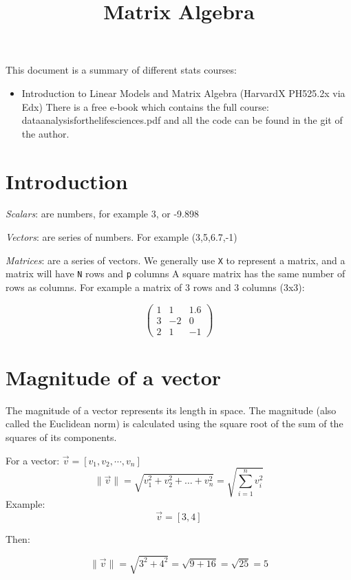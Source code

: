 \documentclass[
  letterpaper,
  DIV=11,
  numbers=noendperiod]{scrartcl}
\title{Matrix Algebra}
\author{}
\date{}
\providecommand{\tightlist}{%
  \setlength{\itemsep}{0pt}\setlength{\parskip}{0pt}}
\begin{document}
\maketitle


This document is a summary of different stats courses:

\begin{itemize}
\tightlist
\item
  Introduction to Linear Models and Matrix Algebra (HarvardX PH525.2x
  via Edx) There is a free e-book which contains the full course:
  dataanalysisforthelifesciences.pdf and all the code can be found in
  the git of the author.
\end{itemize}

\section{Introduction}\label{introduction}

\emph{Scalars}: are numbers, for example 3, or -9.898

\emph{Vectors}: are series of numbers. For example (3,5,6.7,-1)

\emph{Matrices}: are a series of vectors. We generally use \texttt{X} to
represent a matrix, and a matrix will have \texttt{N} rows and
\texttt{p} columns A square matrix has the same number of rows as
columns. For example a matrix of 3 rows and 3 columns (3x3):

\[
\begin{pmatrix}
1 & 1 & 1.6 \\
3 & -2 & 0 \\
2 & 1 & -1
\end{pmatrix}
\]

\section{Magnitude of a vector}\label{magnitude-of-a-vector}

The magnitude of a vector represents its length in space. The magnitude
(also called the Euclidean norm) is calculated using the square root of
the sum of the squares of its components.

For a vector: \(\vec{v} = [v_1,v_2,\cdots,v_n]\) \[
\|\vec{v}\| = \sqrt{v_1^2 + v_2^2 + \dots + v_n^2} = \sqrt{\sum_{i=1}^{n} v_i^2}
\] Example: \[
\vec{v} = [3, 4]
\]

Then:

\[
\|\vec{v}\| = \sqrt{3^2 + 4^2} = \sqrt{9 + 16} = \sqrt{25} = 5
\]
\end{document}
